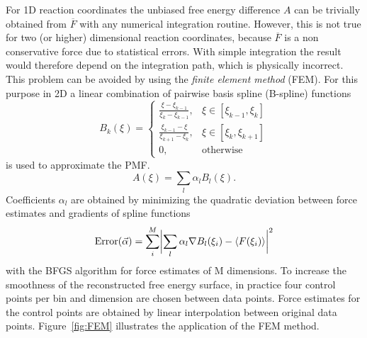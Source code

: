 For 1D reaction coordinates the unbiased free energy difference $A$ can be trivially obtained from $\overline{F}$ with any numerical integration routine.\autocite{davis2007methods}
However, this is not true for two (or higher) dimensional reaction coordinates, because $\overline{F}$ is a non conservative force due to statistical errors.\autocite{comer2015adaptive} With simple integration the result would therefore depend on the integration path, which is physically incorrect. This problem can be avoided by using the \textit{finite element method} (FEM).\autocite{darve2008adaptive} For this purpose in 2D a linear combination of pairwise basis spline (B-spline)\autocite{de1972calculating} functions
\begin{equation}
  B_k(\xi)=\left\{\begin{array}{ll} \frac{\xi-\xi_{k-1}}{\xi_k-\xi_{k-1}}, & \xi \in [\xi_{k-1},\xi_k] \\
                                    \frac{\xi_{k-1}-\xi}{\xi_{k+1}-\xi_{k}}, & \xi \in [\xi_{k},\xi_{k+1}] \\
                                    0, & \text{otherwise}
                  \end{array}\right.
  \label{eq:B spline}
\end{equation}
is used to approximate the PMF.
\begin{equation}
  A(\xi) = \sum_l \alpha_l B_l(\xi). \label{eq:FEM}
\end{equation}
Coefficients $\alpha_l$ are obtained by minimizing the quadratic deviation between force estimates and gradients of spline functions
\begin{equation}
\text{Error}(\vec{\alpha})=\sum_i^M\biggl|\sum_l \alpha_l \nabla B_l(\xi_i) - \braket{F(\xi_i)} \biggr|^2
  \label{eq:RMSD}
\end{equation}
with the BFGS algorithm\autocite{nocedal2006numerical} for force estimates of M dimensions.\autocite{darve2008adaptive} To increase the smoothness of the reconstructed free energy surface, in practice four control points per bin and dimension are chosen between data points. Force estimates for the control points are obtained by linear interpolation between original data points. Figure~\ref{fig:FEM} illustrates the application of the FEM method.

